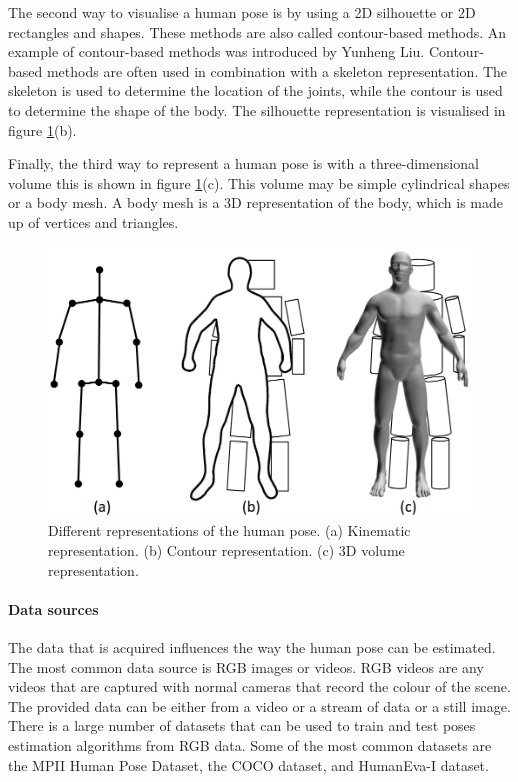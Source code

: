 The second way to visualise a human pose is by using a 2D silhouette or 2D rectangles and shapes. These methods are also called contour-based methods. An example of contour-based methods was introduced by Yunheng Liu\cite{contourHPE}. Contour-based methods are often used in combination with a skeleton representation. The skeleton is used to determine the location of the joints, while the contour is used to determine the shape of the body. The silhouette representation is visualised in figure \ref{fig:pose_representation}(b).

Finally, the third way to represent a human pose is with a three-dimensional volume this is shown in figure \ref{fig:pose_representation}(c). This volume may be simple cylindrical shapes or a body mesh. A body mesh is a 3D representation of the body, which is made up of vertices and triangles.

\begin{figure}[ht]
    \centering
    \includegraphics[width=0.6\linewidth]{figures/HPE/PoseRepresentation.png}
    \caption[Different representations of the human pose]{Different representations of the human pose. (a) Kinematic representation. (b) Contour representation. (c) 3D volume representation. \cite{HPESurveyOriginal}}
    \label{fig:pose_representation}
\end{figure}

\paragraph{Data sources}

The data that is acquired influences the way the human pose can be estimated. The most common data source is RGB images or videos. RGB videos are any videos that are captured with normal cameras that record the colour of the scene. The provided data can be either from a video or a stream of data or a still image. There is a large number of datasets that can be used to train and test poses estimation algorithms from RGB data. Some of the most common datasets are the MPII Human Pose Dataset\cite{MPII}, the COCO dataset\cite{Coco}, and HumanEva-I dataset\cite{HumanEva}.

